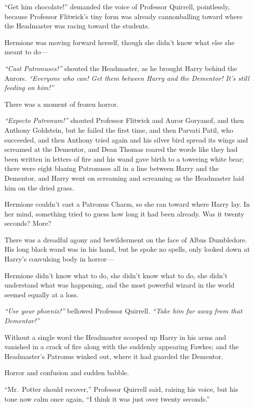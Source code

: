 ``Get him chocolate!'' demanded the voice of Professor Quirrell,
pointlessly, because Professor Flitwick's tiny form was already
cannonballing toward where the Headmaster was racing toward the
students.

Hermione was moving forward herself, though she didn't know what else
she meant to do---

\emph{``Cast Patronuses!''} shouted the Headmaster, as he brought Harry
behind the Aurors. \emph{``Everyone who can! Get them between Harry and
the Dementor! It's still feeding on him!''}

There was a moment of frozen horror.

\emph{``Expecto Patronum!''} shouted Professor Flitwick and Auror
Goryanof, and then Anthony Goldstein, but he failed the first time, and
then Parvati Patil, who succeeded, and then Anthony tried again and his
silver bird spread its wings and screamed at the Dementor, and Dean
Thomas roared the words like they had been written in letters of fire
and his wand gave birth to a towering white bear; there were eight
blazing Patronuses all in a line between Harry and the Dementor, and
Harry went on screaming and screaming as the Headmaster laid him on the
dried grass.

Hermione couldn't cast a Patronus Charm, so she ran toward where Harry
lay. In her mind, something tried to guess how long it had been already.
Was it twenty seconds? More?

There was a dreadful agony and bewilderment on the face of Albus
Dumbledore. His long black wand was in his hand, but he spoke no spells,
only looked down at Harry's convulsing body in horror---

Hermione didn't know what to do, she didn't know what to do, she didn't
understand what was happening, and the most powerful wizard in the world
seemed equally at a loss.

\emph{``Use your phoenix!''} bellowed Professor Quirrell. \emph{``Take
him far away from that Dementor!''}

Without a single word the Headmaster scooped up Harry in his arms and
vanished in a crack of fire along with the suddenly appearing Fawkes;
and the Headmaster's Patronus winked out, where it had guarded the
Dementor.

Horror and confusion and sudden babble.

``Mr.~Potter should recover,'' Professor Quirrell said, raising his
voice, but his tone now calm once again, ``I think it was just over
twenty seconds.''

